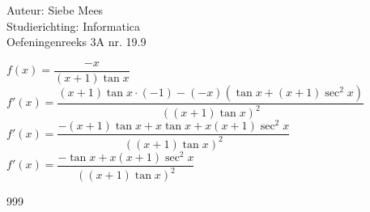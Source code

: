 \documentclass[a4paper]{article}
\begin{document}
  
\noindent \large Auteur: Siebe Mees \\
\noindent \large Studierichting: Informatica\\
\noindent \large Oefeningenreeks 3A nr. 19.9\\

\medskip

\normalsize

$f(x)=\dfrac{-x}{(x+1)\tan x}$\\

$f'(x)=\dfrac{(x+1)\tan x\cdot(-1)-(-x)\left(\tan x+(x+1)\sec^2 x\right)}{\left((x+1)\tan x\right)^2}$\\

$f'(x)=\dfrac{-(x+1)\tan x+x\tan x+x(x+1)\sec^2 x}{\left((x+1)\tan x\right)^2}$\\

$f'(x)=\dfrac{-\tan x+x(x+1)\sec^2 x}{\left((x+1)\tan x\right)^2}$\\


\begin{thebibliography}{999}
\end{thebibliography}
\end{document}
